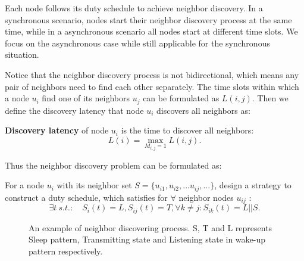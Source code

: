 Each node follows its duty schedule to achieve neighbor discovery. In a synchronous scenario,
nodes start their neighbor discovery process at the same time, while in a asynchronous  scenario
all nodes start at different time slots. We focus on the asynchronous case while still applicable for the
synchronous situation.

 
Notice that the neighbor discovery process is not bidirectional, which means any pair of neighbors 
need to find each other separately. The time slots within which a node $u_i$ find one of its neighbors $u_j$ can be formulated 
as $L(i,j)$. Then we define the discovery latency that node $u_i$ discovers all neighbors as:
\begin{definition}
\textbf{Discovery latency} of node $u_i$ is the time to discover all neighbors:
$$L(i) = \max_{M_{i,j}= 1} L (i,j).
$$
\end{definition}

Thus the neighbor discovery problem can be formulated as:
\begin{problem}
For a node $u_i$ with its neighbor set $S = \{u_{i1},u_{i2},...u_{ij},...\}$, 
design a strategy to construct a duty schedule, which satisfies
for $\forall$ neighbor nodes $u_{ij}$ :
$$
\exists t \ s.t. :  \quad
S_i(t) = L ,
S_{ij}(t) = T,
\forall k \neq j : S_{ik}(t) = L || S.
$$

\end{problem}

\begin{figure}[!h]
\centering
{}
\vspace{0.03in}
\caption{An example of neighbor discovering process. S, T and L represents Sleep pattern, 
Transmitting state and Listening state in wake-up pattern respectively.}
\label{NDexample}
\end{figure}

